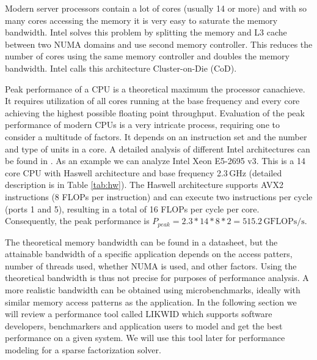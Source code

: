 Modern server processors contain a lot of cores (usually 14 or more) and with so many cores accessing the memory it is very easy to saturate the memory bandwidth. Intel solves this problem by splitting the memory and L3 cache between two NUMA domains and use second memory controller. This reduces the number of cores using the same memory controller and doubles the memory bandwidth. Intel calls this architecture Cluster-on-Die (CoD).

Peak performance of a CPU is a theoretical maximum the processor can\linebreak achieve. It requires utilization of all cores running at the base frequency and every core achieving the highest possible floating point throughput.
Evaluation of the peak performance of modern CPUs is a very intricate process, requiring one to consider a multitude of factors. It depends on an instruction set and the number and type of units in a core. A detailed analysis of different Intel architectures can be found in \cite{dolbeau-2018}.
As an example we can analyze Intel Xeon E5-2695 v3. This is a 14 core CPU with Haswell architecture and base frequency 2.3\,GHz (detailed description is in Table \ref{tab:hw}). The Haswell architecture supports AVX2 instructions (8 FLOPs per instruction) and can execute two instructions per cycle (ports 1 and 5), resulting in a total of 16 FLOPs per cycle per core.
Consequently, the peak performance is $P_{peak} = 2.3 * 14 * 8 * 2 = 515.2\,\textrm{GFLOPs/s}$.

The theoretical memory bandwidth can be found in a datasheet, but the attainable bandwidth of a specific application depends on the access patters, number of threads used, whether NUMA is used, and other factors. Using the theoretical bandwidth is thus not precise for purposes of performance analysis.
A more realistic bandwidth can be obtained using microbenchmarks, ideally with similar memory access patterns as the application.
In the following section we will review a performance tool called LIKWID which supports software developers, benchmarkers and application users to model and get the best performance on a given system. We will use this tool later for performance modeling for a sparse factorization solver.

